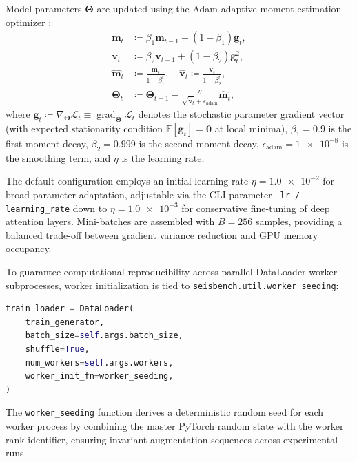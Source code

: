 Model parameters $\bm{\Theta}$ are updated using the Adam adaptive
moment estimation
optimizer \parencite{KingmaBa2014}:
\begin{align}
  \mathbf{m}_t &\coloneqq \beta_1 \mathbf{m}_{t-1} + (1 - \beta_1)
  \mathbf{g}_t, \\
  \mathbf{v}_t &\coloneqq \beta_2 \mathbf{v}_{t-1} + (1 - \beta_2)
  \mathbf{g}_t^2, \\
  \hat{\mathbf{m}}_t &\coloneqq \frac{\mathbf{m}_t}{1 - \beta_1^t}, \quad
  \hat{\mathbf{v}}_t \coloneqq \frac{\mathbf{v}_t}{1 - \beta_2^t}, \\
  \bm{\Theta}_t &\coloneqq \bm{\Theta}_{t-1} -
  \frac{\eta}{\sqrt{\hat{\mathbf{v}}_t} + \epsilon_{\mathrm{adam}}}
  \hat{\mathbf{m}}_t,
\end{align}
where $\mathbf{g}_t \coloneqq \nabla_{\bm{\Theta}} \mathcal{L}_t
\equiv \operatorname{grad}_{\bm{\Theta}} \mathcal{L}_t$
denotes the stochastic parameter gradient vector (with expected stationarity
condition $\mathbb{E}[\mathbf{g}_t] = \mathbf{0}$ at local minima),
$\beta_1 = \num{0.9}$ is the first moment decay, $\beta_2 = \num{0.999}$ is the
second moment
decay, $\epsilon_{\mathrm{adam}} = \num{1e-8}$ is the smoothing term,
and $\eta$ is
the learning rate.

The default configuration employs an initial learning rate $\eta =
\num{1.0e-2}$ for
broad parameter adaptation, adjustable via the CLI parameter
\texttt{-lr / --learning\_rate}
down to $\eta = \num{1.0e-3}$ for conservative fine-tuning of deep
attention layers.
Mini-batches are assembled with $B = \num{256}$ samples, providing a
balanced trade-off
between gradient variance reduction and \ac{GPU} memory occupancy.

To guarantee computational reproducibility across parallel DataLoader worker
subprocesses, worker initialization is tied to
\texttt{seisbench.util.worker\_seeding}:
\begin{lstlisting}[language=python,basicstyle=\scriptsize\ttfamily]
train_loader = DataLoader(
    train_generator,
    batch_size=self.args.batch_size,
    shuffle=True,
    num_workers=self.args.workers,
    worker_init_fn=worker_seeding,
)
\end{lstlisting}
The \texttt{worker\_seeding} function derives a deterministic random seed for
each worker process by combining the master PyTorch random state
with the worker
rank identifier, ensuring invariant augmentation sequences across
experimental runs.

